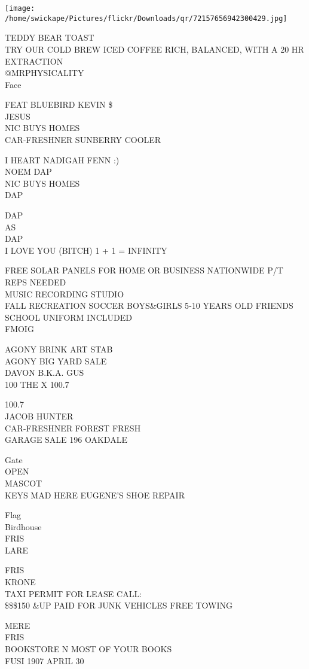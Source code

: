 \documentclass[10pt,letterpaper]{article}
\begin{document}
\texttt{[image: /home/swickape/Pictures/flickr/Downloads/qr/72157656942300429.jpg]}


TEDDY BEAR TOAST\\
TRY OUR COLD BREW ICED COFFEE RICH, BALANCED, WITH A 20 HR EXTRACTION\\
@MRPHYSICALITY\\
Face

FEAT BLUEBIRD KEVIN \$\\
JESUS\\
NIC BUYS HOMES\\
CAR{-}FRESHNER SUNBERRY COOLER

I HEART NADIGAH FENN :)\\
NOEM DAP\\
NIC BUYS HOMES\\
DAP

DAP\\
AS\\
DAP\\
I LOVE YOU (BITCH) 1 + 1 = INFINITY

FREE SOLAR PANELS FOR HOME OR BUSINESS NATIONWIDE P/T REPS NEEDED\\
MUSIC RECORDING STUDIO\\
FALL RECREATION SOCCER BOYS\&GIRLS 5{-}10 YEARS OLD FRIENDS SCHOOL UNIFORM INCLUDED\\
FMOIG

AGONY BRINK ART STAB\\
AGONY BIG YARD SALE\\
DAVON B.K.A. GUS\\
100 THE X 100.7

100.7\\
JACOB HUNTER\\
CAR{-}FRESHNER FOREST FRESH\\
GARAGE SALE 196 OAKDALE

Gate\\
OPEN\\
MASCOT\\
KEYS MAD HERE EUGENE'S SHOE REPAIR

Flag\\
Birdhouse\\
FRIS\\
LARE

FRIS\\
KRONE\\
TAXI PERMIT FOR LEASE CALL:\\
\$\$\$150 \&UP PAID FOR JUNK VEHICLES FREE TOWING

MERE\\
FRIS\\
BOOKSTORE N MOST OF YOUR BOOKS\\
FUSI 1907 APRIL 30
\end{document}
